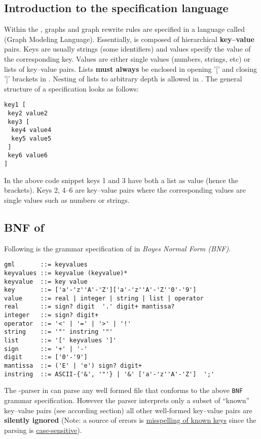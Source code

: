
\subsection{Introduction to the specification language \GML{}}

Within the \GGL{}, graphs and graph rewrite rules are specified in a
language called \GML{} (Graph Modeling Language). Essentially,
\GML{} is composed of hierarchical \textbf{key--value} pairs. Keys are
usually strings (some identifiers) and values specify the value of the
corresponding key. Values are either single values (numbers, strings, etc) or
lists of key--value pairs. Lists \textbf{must always} be enclosed in opening '['
and closing ']' brackets in \GML{}. Nesting of lists to arbitrary depth is
allowed in \GML{}. The general structure of a \GML{} specification
looks as follows: \startGML
\begin{verbatim}
key1 [
 key2 value2
 key3 [
  key4 value4
  key5 value5
 ]
 key6 value6
] 
\end{verbatim}
\endGML

\noindent In the above code snippet keys 1 and 3 have both a list as value
(hence the brackets). Keys 2, 4--6 are key--value pairs where the
corresponding values are single values such as numbers or strings.

\subsection{BNF of \GML{}}

Following is the grammar specification of \GML{} in \emph{Boyes Normal
Form (BNF)}.

\startGML
\begin{verbatim}
gml       ::= keyvalues
keyvalues ::= keyvalue (keyvalue)*
keyvalue  ::= key value
key       ::= ['a'-'z''A'-'Z']['a'-'z''A'-'Z''0'-'9']
value     ::= real | integer | string | list | operator
real      ::= sign? digit  '.' digit+ mantissa?
integer   ::= sign? digit+
operator  ::= '<' | '=' | '>' | '!'
string    ::= '"' instring '"'
list      ::= '[' keyvalues ']'
sign      ::= '+' | '-'
digit     ::= ['0'-'9']
mantissa  ::= ('E' | 'e') sign? digit+
instring  ::= ASCII-{'&', '"'} | '&' ['a'-'z''A'-'Z']  ';'
\end{verbatim}
\endGML

\noindent The \GML{}-parser in \GGL{} can parse any well formed
\GML{} file that conforms to the above \texttt{BNF} grammar
specification. However the parser interprets only a subset of ``known''
key--value pairs (see according section) all other well-formed
key--value pairs are \textbf{silently ignored} (Note: a source of errors
is \underline{misspelling of known keys} since the parsing is
\underline{case-sensitive}).

